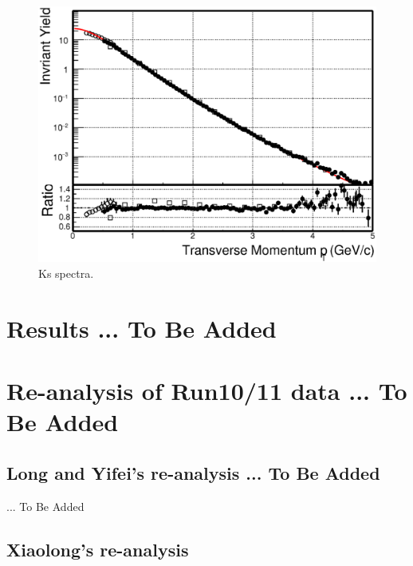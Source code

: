 \documentclass[a4paper]{article}
\begin{document}
\begin{figure}
\centering
\includegraphics[width=0.7\columnwidth]{figure/Run14_D0HFT/Ks_spectra_PtCut_0.eps}
\caption{Ks spectra.}
\label{Ks_spectra}
\end{figure}

\section{\label{results}Results ... To Be Added}

\section{\label{Run1011}Re-analysis of Run10/11 data ... To Be Added}

\subsection{Long and Yifei's re-analysis ... To Be Added}


... To Be Added

\subsection{Xiaolong's re-analysis}




\clearpage


% 
\end{document}
